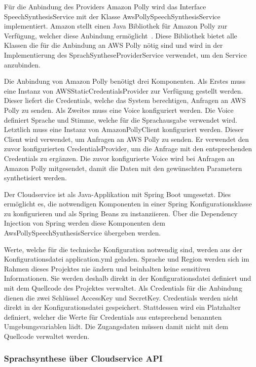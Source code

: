 Für die Anbindung des Providers Amazon Polly wird das Interface SpeechSynthesisService mit der Klasse AwsPollySpeechSynthesisService implementiert.
Amazon stellt einen Java Bibliothek für Amazon Polly zur Verfügung, welcher diese Anbindung ermöglicht~\cite{aws_polly_sdks}.
Diese Bibliothek bietet alle Klassen die für die Anbindung an AWS Polly nötig sind und wird in der Implementierung des SprachSyntheseProviderService verwendet, um den Service anzubinden.

Die Anbindung von Amazon Polly benötigt drei Komponenten.
Als Erstes muss eine Instanz von AWSStaticCredentialsProvider zur Verfügung gestellt werden.
Dieser liefert die Credentials, welche das System berechtigen, Anfragen an AWS Polly zu senden.
Als Zweites muss eine Voice konfiguriert werden.
Die Voice definiert Sprache und Stimme, welche für die Sprachausgabe verwendet wird.
Letztlich muss eine Instanz von AmazonPollyClient konfiguriert werden.
Dieser Client wird verwendet, um Anfragen an AWS Polly zu senden.
Er verwendet den zuvor konfigurierten CredentialsProvider, um die Anfrage mit den entsprechenden Credentials zu ergänzen.
Die zuvor konfigurierte Voice wird bei Anfragen an Amazon Polly mitgesendet, damit die Daten mit den gewünschten Parametern synthetisiert werden.

Der Cloudservice ist als Java-Applikation mit Spring Boot umgesetzt.
Dies ermöglicht es, die notwendigen Komponenten in einer Spring Konfigurationsklasse zu konfigurieren und als Spring Beans zu instanziieren.
Über die Dependency Injection von Spring werden diese Komponenten dem AwsPollySpeechSynthesisService übergeben werden.

Werte, welche für die technische Konfiguration notwendig sind, werden aus der Konfigurationsdatei application.yml geladen.
Sprache und Region werden sich im Rahmen dieses Projektes nie ändern und beinhalten keine sensitiven Informationen.
Sie werden deshalb direkt in der Konfigurationsdatei definiert und mit dem Quellcode des Projektes verwaltet.
Als Credentials für die Anbindung dienen die zwei Schlüssel AccessKey und SecretKey.
Credentials werden nicht direkt in der Konfigurationsdatei gespeichert.
Stattdessen wird ein Platzhalter definiert, welcher die Werte für Credentials aus entsprechend benannten Umgebungsvariablen lädt.
Die Zugangsdaten müssen damit nicht mit dem Quellcode verwaltet werden.

\subsubsection{Sprachsynthese über Cloudservice API}

